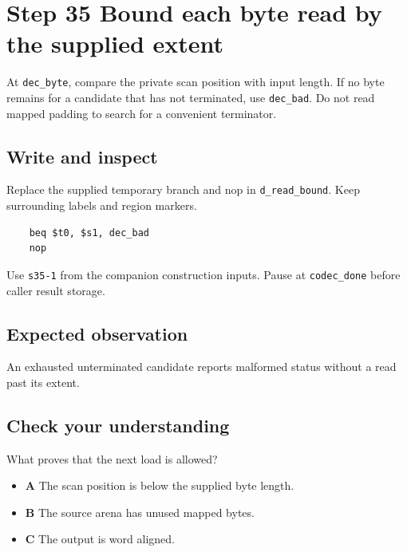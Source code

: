 \section{Step 35 Bound each byte read by the supplied extent}\label{delta-s35}

At \texttt{dec\_byte}, compare the private scan position with input length. If no byte remains for a candidate that has not terminated, use \texttt{dec\_bad}. Do not read mapped padding to search for a convenient terminator.

\subsection{Write and inspect}
Replace the supplied temporary branch and nop in \texttt{d\_read\_bound}. Keep surrounding labels and region markers.

\begin{verbatim}
    beq $t0, $s1, dec_bad
    nop
\end{verbatim}
Use \texttt{s35-1} from the companion construction inputs. Pause at \texttt{codec\_done} before caller result storage.

\subsection{Expected observation}
An exhausted unterminated candidate reports malformed status without a read past its extent.

\subsection{Check your understanding}
What proves that the next load is allowed?

\begin{itemize}
  \item \textbf{A} The scan position is below the supplied byte length.
  \item \textbf{B} The source arena has unused mapped bytes.
  \item \textbf{C} The output is word aligned.
\end{itemize}
